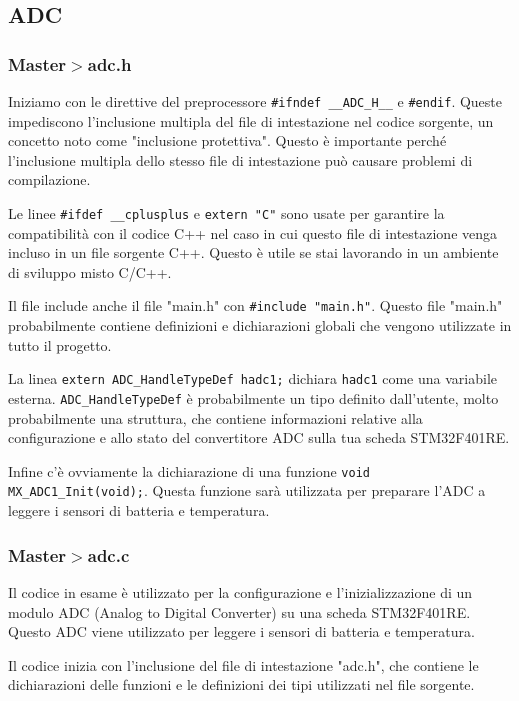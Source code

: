 \documentclass{article}
\begin{document}
    \subsection{ADC}
        \subsubsection{Master$>$adc.h}
          Iniziamo con le direttive del preprocessore \texttt{\#ifndef \_\_ADC\_H\_\_} e \texttt{\#endif}. Queste impediscono l'inclusione multipla del file di intestazione nel codice sorgente, un concetto noto come "inclusione protettiva". Questo è importante perché l'inclusione multipla dello stesso file di intestazione può causare problemi di compilazione.

          Le linee \texttt{\#ifdef \_\_cplusplus} e \texttt{extern "C"} sono usate per garantire la compatibilità con il codice C++ nel caso in cui questo file di intestazione venga incluso in un file sorgente C++. Questo è utile se stai lavorando in un ambiente di sviluppo misto C/C++.
          
          Il file include anche il file "main.h" con \texttt{\#include "main.h"}. Questo file "main.h" probabilmente contiene definizioni e dichiarazioni globali che vengono utilizzate in tutto il progetto.
          
          La linea \texttt{extern ADC\_HandleTypeDef hadc1;} dichiara \texttt{hadc1} come una variabile esterna. \texttt{ADC\_HandleTypeDef} è probabilmente un tipo definito dall'utente, molto probabilmente una struttura, che contiene informazioni relative alla configurazione e allo stato del convertitore ADC sulla tua scheda STM32F401RE.
          
          Infine c'è ovviamente la dichiarazione di una funzione \texttt{void MX\_ADC1\_Init(void);}. Questa funzione sarà utilizzata per preparare l'ADC a leggere i sensori di batteria e temperatura.
        \subsubsection{Master$>$adc.c}
        Il codice in esame è utilizzato per la configurazione e l'inizializzazione di un modulo ADC (Analog to Digital Converter) su una scheda STM32F401RE. Questo ADC viene utilizzato per leggere i sensori di batteria e temperatura.

        Il codice inizia con l'inclusione del file di intestazione "adc.h", che contiene le dichiarazioni delle funzioni e le definizioni dei tipi utilizzati nel file sorgente.
        
\end{document}
